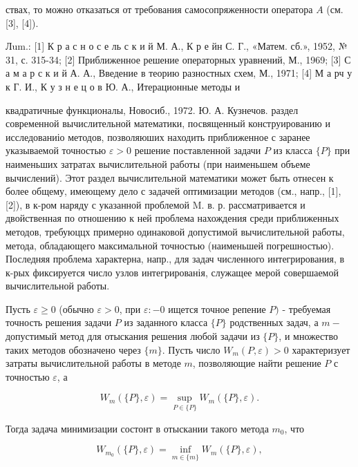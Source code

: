 \documentclass[10pt]{article}
\begin{document}
ствах, то можно отказаться от требования самосопряженности оператора $A$ (см. [3], [4]).



Лum.: [1] К р а с н о с е ль с к и й М. А., К р е йн С. Г., «Матем. сб.», 1952, № 31, с. 315-34; [2] Приближенное решение операторных уравнений, М., 1969; [3] С а м а р с к и й А. А., Введение в теорию разностных схем, М., 1971; [4] М а рч у к Г. И., К у з н е ц о в Ю. А., Итерационные методы и



квадратичные функционалы, Новосиб., 1972. Ю. А. Кузнечов. раздел современной вычислительной математики, посвященный конструированию и исследованиіо методов, позволяюших находить приближенное с заранее указываемой точностью $\varepsilon>0$ решение поставленной задачи $P$ из класса $\{P\}$ при наименьших затратах вычислительной работы (при наименьшем объеме вычислений). Этот раздел вычислительной математики может быть отнесен к более общему, имеющему дело с задачей оптимизации методов (см., напр., [1], [2]), в к-ром наряду с указанной проблемой M. в. р. рассматривается и двойственная по отношению к ней проблема нахождения среди приближенных методов, требуюццх примерно одинаковой допустимой вычислительной работы, метода, обладающего максимальной точностью (наименьшей погрешностью). Последняя проблема характерна, напр., для задач численного интегрирования, в к-рых фиксируется число узлов интегрированія, служащее мерой совершаемой вычислительной работы.



Пусть $\varepsilon \geqslant 0$ (обычно $\varepsilon>0$, при $\varepsilon:-0$ ищется точное репение $P)$ - требуемая точность решения задачи $P$ из заданного класса $\{P\}$ родственных задач, а $m-$ допустимый метод для отыскания решения любой задачи из $\{P\}$, и множество таких методов обозначено через $\{m\}$. Пусть число $W_{m}(P, \varepsilon)>0$ характеризует затраты вычислительной работы в методе $m$, позволяющие найти решение $P$ с точностью $\varepsilon$, а



\[

W_{m}(\{P\}, \varepsilon)=\sup _{P \in\{P\}} W_{m}(\{P\}, \varepsilon) .

\]



Тогда задача минимизации состонт в отыскании такого метода $m_{0}$, что



\[

W_{m_{0}}(\{P\}, \varepsilon)=\inf _{m \in\{m\}} W_{m}(\{P\}, \varepsilon),

\]
\end{document}
